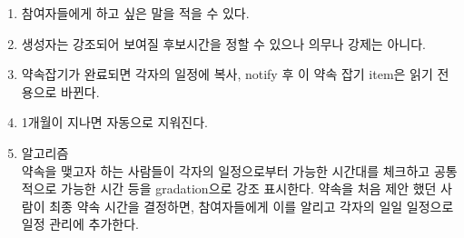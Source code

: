 \documentclass[a4paper,titlepage]{article}
\begin{document}
\begin{funcreq}
\begin{enumerate}
		\item 참여자들에게 하고 싶은 말을 적을 수 있다.
		\item 생성자는 강조되어 보여질 후보시간을 정할 수 있으나 의무나 강제는 아니다.
		\item 약속잡기가 완료되면 각자의 일정에 복사, notify 후 이 약속 잡기 item은 읽기 전용으로 바뀐다. 
		\item 1개월이 지나면 자동으로 지워진다. 
		\item 알고리즘\\
		약속을 맺고자 하는 사람들이 각자의 일정으로부터 가능한 시간대를 체크하고 공통적으로 가능한 시간 등을 gradation으로 강조 표시한다.
		약속을 처음 제안 했던 사람이 최종 약속 시간을 결정하면, 참여자들에게 이를 알리고 각자의 일일 일정으로 일정 관리에 추가한다. 
	\end{enumerate}
\end{funcreq}
\end{document}
